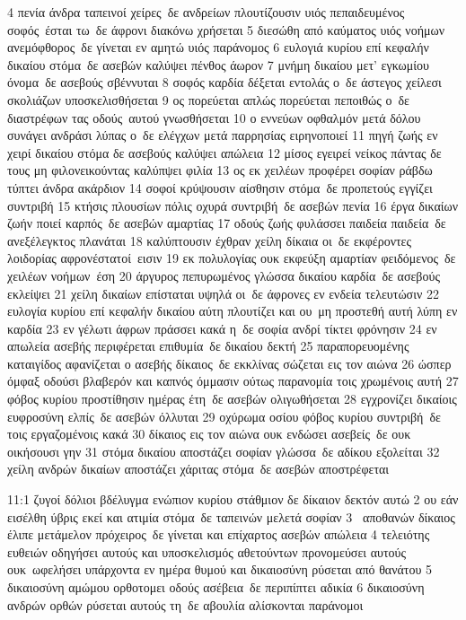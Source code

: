 \documentclass[10pt,oneside,footinclude=true,headinclude=true]{scrbook} %
\begin{document}
4 πενία άνδρα ταπεινοί χείρες δε ανδρείων πλουτίζουσιν υιός πεπαιδευμένος σοφός έσται τω δε άφρονι διακόνω χρήσεται
5 διεσώθη από καύματος υιός νοήμων ανεμόφθορος δε γίνεται εν αμητώ υιός παράνομος
6 ευλογιά κυρίου επί κεφαλήν δικαίου στόμα δε ασεβών καλύψει πένθος άωρον
7 μνήμη δικαίου μετ' εγκωμίου όνομα δε ασεβούς σβέννυται
8 σοφός καρδία δέξεται εντολάς ο δε άστεγος χείλεσι σκολιάζων υποσκελισθήσεται
9 ος πορεύεται απλώς πορεύεται πεποιθώς ο δε διαστρέφων τας οδούς αυτού γνωσθήσεται
10 ο εννεύων οφθαλμόν μετά δόλου συνάγει ανδράσι λύπας ο δε ελέγχων μετά παρρησίας ειρηνοποιεί
11 πηγή ζωής εν χειρί δικαίου στόμα δε ασεβούς καλύψει απώλεια
12 μίσος εγειρεί νείκος πάντας δε τους μη φιλονεικούντας καλύπψει φιλία
13 ος εκ χειλέων προφέρει σοφίαν ράβδω τύπτει άνδρα ακάρδιον
14 σοφοί κρύψουσιν αίσθησιν στόμα δε προπετούς εγγίζει συντριβή
15 κτήσις πλουσίων πόλις οχυρά συντριβή δε ασεβών πενία
16 έργα δικαίων ζωήν ποιεί καρπός δε ασεβών αμαρτίας
17 οδούς ζωής φυλάσσει παιδεία παιδεία δε ανεξέλεγκτος πλανάται
18 καλύπτουσιν έχθραν χείλη δίκαια οι δε εκφέροντες λοιδορίας αφρονέστατοί εισιν
19 εκ πολυλογίας ουκ εκφεύξη αμαρτίαν φειδόμενος δε χειλέων νοήμων έση
20 άργυρος πεπυρωμένος γλώσσα δικαίου καρδία δε ασεβούς εκλείψει
21 χείλη δικαίων επίσταται υψηλά οι δε άφρονες εν ενδεία τελευτώσιν
22 ευλογία κυρίου επί κεφαλήν δικαίου αύτη πλουτίζει και ου μη προστεθή αυτή λύπη εν καρδία
23 εν γέλωτι άφρων πράσσει κακά η δε σοφία ανδρί τίκτει φρόνησιν
24 εν απωλεία ασεβής περιφέρεται επιθυμία δε δικαίου δεκτή
25 παραπορευομένης καταιγίδος αφανίζεται ο ασεβής δίκαιος δε εκκλίνας σώζεται εις τον αιώνα
26 ώσπερ όμφαξ οδούσι βλαβερόν και καπνός όμμασιν ούτως παρανομία τοις χρωμένοις αυτή
27 φόβος κυρίου προστίθησιν ημέρας έτη δε ασεβών ολιγωθήσεται
28 εγχρονίζει δικαίοις ευφροσύνη ελπίς δε ασεβών όλλυται
29 οχύρωμα οσίου φόβος κυρίου συντριβή δε τοις εργαζομένοις κακά
30 δίκαιος εις τον αιώνα ουκ ενδώσει ασεβείς δε ουκ οικήσουσι γην
31 στόμα δικαίου αποστάζει σοφίαν γλώσσα δε αδίκου εξολείται
32 χείλη ανδρών δικαίων αποστάζει χάριτας στόμα δε ασεβών αποστρέφεται
\par
11:1 ζυγοί δόλιοι βδέλυγμα ενώπιον κυρίου στάθμιον δε δίκαιον δεκτόν αυτώ
2 ου εάν εισέλθη ύβρις εκεί και ατιμία στόμα δε ταπεινών μελετά σοφίαν
3  αποθανών δίκαιος έλιπε μετάμελον πρόχειρος δε γίνεται και επίχαρτος ασεβών απώλεια
4 τελειότης ευθειών οδηγήσει αυτούς και υποσκελισμός αθετούντων προνομεύσει αυτούς ουκ ωφελήσει υπάρχοντα εν ημέρα θυμού και δικαιοσύνη ρύσεται από θανάτου
5 δικαιοσύνη αμώμου ορθοτομει οδούς ασέβεια δε περιπίπτει αδικία
6 δικαιοσύνη ανδρών ορθών ρύσεται αυτούς τη δε αβουλία αλίσκονται παράνομοι
\end{document}
